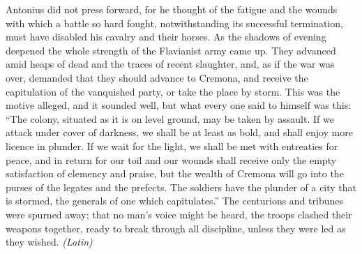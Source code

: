 
Antonius did not press forward, for he thought of the fatigue and the wounds with which a battle so hard fought, notwithstanding its successful termination, must have disabled his cavalry and their horses. As the shadows of evening deepened the whole strength of the Flavianist army came up. They advanced amid heaps of dead and the traces of recent slaughter, and, as if the war was over, demanded that they should advance to Cremona, and receive the capitulation of the vanquished party, or take the place by storm. This was the motive alleged, and it sounded well, but what every one said to himself was this: ``The colony, situated as it is on level ground, may be taken by assault. If we attack under cover of darkness, we shall be at least as bold, and shall enjoy more licence in plunder. If we wait for the light, we shall be met with entreaties for peace, and in return for our toil and our wounds shall receive only the empty satisfaction of clemency and praise, but the wealth of Cremona will go into the purses of the legates and the prefects. The soldiers have the plunder of a city that is stormed, the generals of one which capitulates.'' The centurions and tribunes were spurned away; that no man's voice might be heard, the troops clashed their weapons together, ready to break through all discipline, unless they were led as they wished. \emph{(Latin)}


